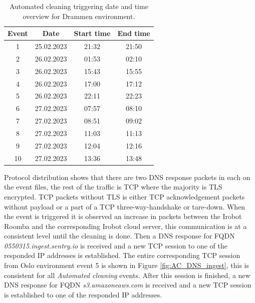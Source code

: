  \begin{table}[H]
\centering
\caption{Automated cleaning triggering date and time overview for Drammen environment.}
\label{tab:AC_dateandtimeDrammen}
\begin{tabular}{|c|c|c|c|}
\hline
\textbf{Event} & \textbf{Date} & \textbf{Start time} & \textbf{End time} \\ \hline
1              & 25.02.2023         & 21:32               & 21:50             \\ \hline
2              & 26.02.2023         & 01:53               & 02:10             \\ \hline
3              & 26.02.2023         & 15:43               & 15:55             \\ \hline
4              & 26.02.2023         & 17:00               & 17:12             \\ \hline
5              & 26.02.2023         & 22:11               & 22:23             \\ \hline
6              & 27.02.2023         & 07:57               & 08:10             \\ \hline
7              & 27.02.2023         & 08:51               & 09:02             \\ \hline
8              & 27.02.2023         & 11:03               & 11:13             \\ \hline
9              & 27.02.2023         & 12:04               & 12:16             \\ \hline
10             & 27.02.2023         & 13:36               & 13:48             \\ \hline
\end{tabular}
\end{table}

Protocol distribution shows that there are two DNS response packets in each on the event files, the rest of the traffic is TCP where the majority is TLS encrypted. TCP packets without TLS is either TCP acknowledgement packets without payload or a part of a TCP three-way-handshake or tare-down. When the event is triggered it is observed an increase in packets between the Irobot Roomba and the corresponding Irobot cloud server, this communication is at a consistent level until the cleaning is done. Then a DNS response for FQDN \textit{0550315.ingest.sentry.io} is received and a new TCP session to one of the responded IP addresses is established. The entire corresponding TCP session from Oslo environment event 5 is shown in Figure \ref{fig:AC_DNS_ingest}, this is consistent for all \textit{Automated cleaning} events. After this session is finished, a new DNS response for FQDN \textit{s3.amazoneaws.com} is received and a new TCP session is established to one of the responded IP addresses.  

